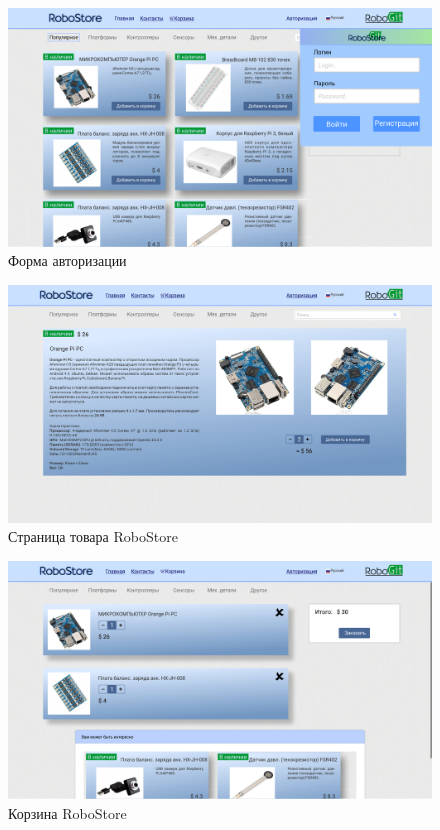 \documentclass[12pt, a4paper]{article}
\begin{document}
\begin{figure}[H]
  \centering
  \includegraphics[width=16cm]{png/store_auth.png}
  \caption{Форма авторизации}
\end{figure}

\begin{figure}[H]
  \centering
  \includegraphics[width=16cm]{png/store_item.png}
  \caption{Страница товара RoboStore}
\end{figure}

\begin{figure}[H]
  \centering
  \includegraphics[width=16cm]{png/store_bin.png}
  \caption{Корзина RoboStore}
\end{figure}
\end{document}
